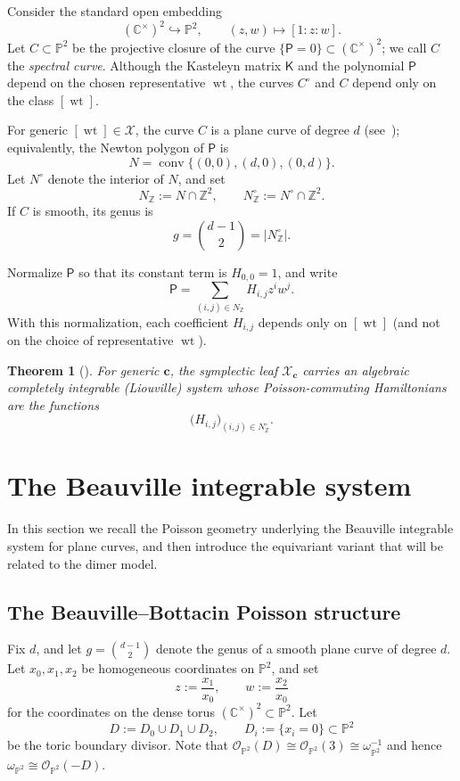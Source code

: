 \documentclass[dvipsnames,11pt]{article}
\newtheorem{theorem}{Theorem}[section]
\theoremstyle{definition}
\newcommand{\wt}{\operatorname{wt}}
\newcommand{\cO}{\mathcal{O}}
\newcommand{\Z}{{\mathbb Z}}
\newcommand{\C}{{\mathbb C}}
\renewcommand{\P}{{\mathbb P}}
\def\K{\mathsf K}
\begin{document}
Consider the standard open embedding
\[
(\C^\times)^2 \hookrightarrow \P^2,
\qquad
(z,w)\mapsto [1:z:w].
\]
Let \(C\subset \P^2\) be the projective closure of the curve \(\{\mathsf P=0\}\subset(\C^\times)^2\); we call \(C\) the \emph{spectral curve}. Although the Kasteleyn matrix \(\K\) and the polynomial \(\mathsf P\) depend on the chosen representative \(\wt\), the curves \(C^\circ\) and \(C\) depend only on the class \([\wt]\).

For generic \([\wt]\in\mathcal X\), the curve \(C\) is a plane curve of degree \(d\) (see~\cite[Theorem~1]{KO}); equivalently, the Newton polygon of \(\mathsf P\) is
\[
N=\operatorname{conv}\{(0,0),(d,0),(0,d)\}.
\]
Let \(N^\circ\) denote the interior of \(N\), and set
\[
N_{\Z}:=N\cap \Z^2,
\qquad
N_{\Z}^\circ:=N^\circ\cap \Z^2.
\]
If \(C\) is smooth, its genus is
\[
g=\binom{d-1}{2}=|N_{\Z}^\circ|.
\]

Normalize \(\mathsf P\) so that its constant term is \(H_{0,0}=1\), and write
\[
\mathsf P=\sum_{(i,j)\in N_{\Z}} H_{i,j}z^i w^j.
\]
With this normalization, each coefficient \(H_{i,j}\) depends only on \([\wt]\) (and not on the choice of representative \(\wt\)). 

\begin{theorem}[{\cite[Theorem~1.2]{GK13}}]
For generic $\bm c$, the symplectic leaf $\mathcal X_{\bm c}$ carries an algebraic completely integrable (Liouville) system whose Poisson-commuting Hamiltonians are the functions
\[
\bigl(H_{i,j}\bigr)_{(i,j)\in N^\circ_{\Z}}.
\]
\end{theorem}



\section{The Beauville integrable system}

In this section we recall the Poisson geometry underlying the Beauville integrable system for plane curves, and then introduce the equivariant variant that will be related to the dimer model.

\subsection{The Beauville--Bottacin Poisson structure} \label{sec:Beauville_Poisson_structure}

Fix $d$, and let $g=\binom{d-1}{2}$ denote the genus of a smooth plane curve of degree $d$.
Let $x_0,x_1,x_2$ be homogeneous coordinates on $\P^2$, and set
\[
z:=\frac{x_1}{x_0},\qquad w:=\frac{x_2}{x_0}
\]
for the coordinates on the dense torus $(\C^\times)^2\subset \P^2$.
Let
\[
D:=D_0\cup D_1\cup D_2,\qquad D_i:=\{x_i=0\}\subset \P^2
\]
be the toric boundary divisor. Note that $\cO_{\P^2}(D)\cong \cO_{\P^2}(3)\cong \omega_{\P^2}^{-1}$ and hence $\omega_{\P^2}\cong \cO_{\P^2}(-D)$.
\end{document}
